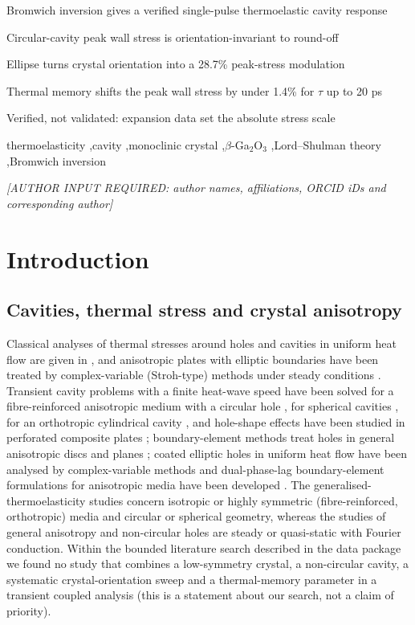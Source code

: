 \documentclass[preprint,12pt]{elsarticle}
\begin{document}
\begin{frontmatter}
\begin{highlights}
\item Bromwich inversion gives a verified single-pulse thermoelastic cavity response
\item Circular-cavity peak wall stress is orientation-invariant to round-off
\item Ellipse turns crystal orientation into a 28.7\% peak-stress modulation
\item Thermal memory shifts the peak wall stress by under 1.4\% for $\tau$ up to 20 ps
\item Verified, not validated: expansion data set the absolute stress scale
\end{highlights}
\begin{keyword}
thermoelasticity \sep cavity \sep monoclinic crystal \sep $\beta$-Ga$_2$O$_3$ \sep Lord--Shulman theory \sep Bromwich inversion
\end{keyword}
\end{frontmatter}
    \emph{[AUTHOR INPUT REQUIRED: author names, affiliations, ORCID iDs and corresponding author]}


\section{Introduction}
\label{sec:1}

\subsection{Cavities, thermal stress and crystal anisotropy}
\label{sec:1.1}

Classical analyses of thermal stresses around holes and cavities in uniform heat flow are given in \cite{florence1959,florence1960}, and anisotropic plates with elliptic boundaries have been treated by complex-variable (Stroh-type) methods under steady conditions \cite{chao2001}. Transient cavity problems with a finite heat-wave speed have been solved for a fibre-reinforced anisotropic medium with a circular hole \cite{abbas2015}, for spherical cavities \cite{karmakar2016}, for an orthotropic cylindrical cavity \cite{abbas2022}, and hole-shape effects have been studied in perforated composite plates \cite{jafari2019}; boundary-element methods treat holes in general anisotropic discs and planes \cite{fahmy2022,shiah2026}; coated elliptic holes in uniform heat flow have been analysed by complex-variable methods \cite{chen2008} and dual-phase-lag boundary-element formulations for anisotropic media have been developed \cite{fahmy2018}. The generalised-thermoelasticity studies \cite{abbas2015,karmakar2016,abbas2022} concern isotropic or highly symmetric (fibre-reinforced, orthotropic) media and circular or spherical geometry, whereas the studies of general anisotropy and non-circular holes \cite{chao2001,fahmy2022,shiah2026} are steady or quasi-static with Fourier conduction. Within the bounded literature search described in the data package we found no study that combines a low-symmetry crystal, a non-circular cavity, a systematic crystal-orientation sweep and a thermal-memory parameter in a transient coupled analysis (this is a statement about our search, not a claim of priority).
\end{document}
